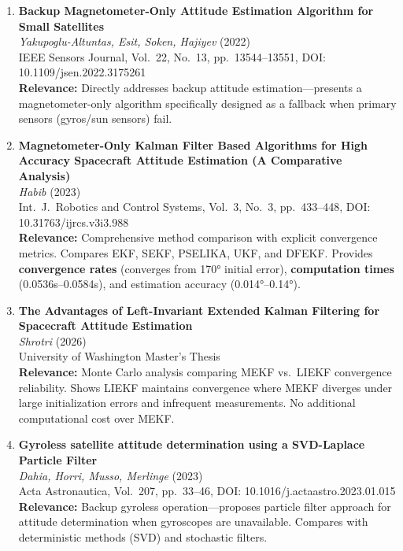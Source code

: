 \documentclass[11pt]{article}
\begin{document}
\begin{enumerate}[label=\textbf{\arabic*.}]
    \item \textbf{Backup Magnetometer-Only Attitude Estimation Algorithm for Small Satellites}\\
    \textit{Yakupoglu-Altuntas, Esit, Soken, Hajiyev} (2022)\\
    IEEE Sensors Journal, Vol.\ 22, No.\ 13, pp.\ 13544--13551, DOI: 10.1109/jsen.2022.3175261\\
    \textbf{Relevance:} Directly addresses backup attitude estimation---presents a magnetometer-only algorithm specifically designed as a fallback when primary sensors (gyros/sun sensors) fail.

    \item \textbf{Magnetometer-Only Kalman Filter Based Algorithms for High Accuracy Spacecraft Attitude Estimation (A Comparative Analysis)}\\
    \textit{Habib} (2023)\\
    Int.\ J.\ Robotics and Control Systems, Vol.\ 3, No.\ 3, pp.\ 433--448, DOI: 10.31763/ijrcs.v3i3.988\\
    \textbf{Relevance:} Comprehensive method comparison with explicit convergence metrics. Compares EKF, SEKF, PSELIKA, UKF, and DFEKF. Provides \textbf{convergence rates} (converges from 170° initial error), \textbf{computation times} (0.0536s--0.0584s), and estimation accuracy (0.014°--0.14°).

    \item \textbf{The Advantages of Left-Invariant Extended Kalman Filtering for Spacecraft Attitude Estimation}\\
    \textit{Shrotri} (2026)\\
    University of Washington Master's Thesis\\
    \textbf{Relevance:} Monte Carlo analysis comparing MEKF vs.\ LIEKF convergence reliability. Shows LIEKF maintains convergence where MEKF diverges under large initialization errors and infrequent measurements. No additional computational cost over MEKF.

    \item \textbf{Gyroless satellite attitude determination using a SVD-Laplace Particle Filter}\\
    \textit{Dahia, Horri, Musso, Merlinge} (2023)\\
    Acta Astronautica, Vol.\ 207, pp.\ 33--46, DOI: 10.1016/j.actaastro.2023.01.015\\
    \textbf{Relevance:} Backup gyroless operation---proposes particle filter approach for attitude determination when gyroscopes are unavailable. Compares with deterministic methods (SVD) and stochastic filters.
\end{enumerate}
\end{document}
